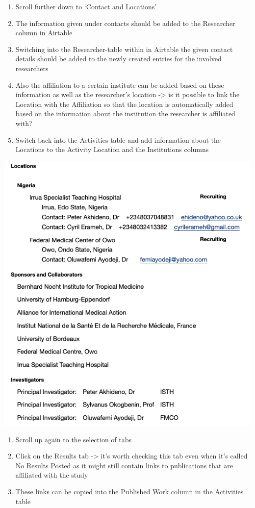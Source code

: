 \documentclass[
]{book}
\begin{document}
\begin{enumerate}
\def\labelenumi{\arabic{enumi}.}
\setcounter{enumi}{9}
\item
  Scroll further down to `Contact and Locations'
\item
  The information given under contacts should be added to the Researcher column in Airtable
\item
  Switching into the Researcher-table within in Airtable the given contact details should be added to the newly created entries for the involved researchers
\item
  Also the affiliation to a certain institute can be added based on these information as well as the researcher's location -\textgreater{} is it possible to link the Location with the Affiliation so that the location is automatically added based on the information about the institution the researcher is affiliated with?
\item
  Switch back into the Activities table and add information about the Locations to the Activity Location and the Institutions columns
\end{enumerate}

\includegraphics{images/clinicaltrial6.png}

\begin{enumerate}
\def\labelenumi{\arabic{enumi}.}
\setcounter{enumi}{14}
\item
  Scroll up again to the selection of tabs
\item
  Click on the Results tab -\textgreater{} it's worth checking this tab even when it's called No Results Posted as it might still contain links to publications that are affiliated with the study
\item
  These links can be copied into the Published Work column in the Activities table
\end{enumerate}
\end{document}
